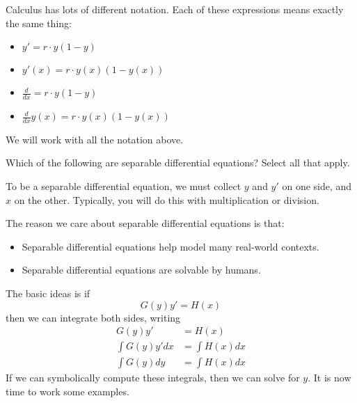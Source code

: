 \documentclass{ximera}
\begin{document}
\begin{warning}
  Calculus has lots of different notation. Each of these expressions
  means exactly the same thing:
  \begin{itemize}
  \item $y' = r\cdot y(1-y)$
  \item $y'(x) = r\cdot y(x)(1-y(x))$
  \item $\frac{d}{dx} = r \cdot y(1-y)$
  \item $\frac{d}{dx} y(x) = r\cdot y(x) (1-y(x))$
  \end{itemize}
  We will work with all the notation above.
\end{warning}

\begin{question}
  Which of the following are separable differential equations?  Select all that apply.
  \begin{selectAll}
  \end{selectAll}
  \begin{hint}
    To be a separable differential equation, we must collect $y$ and
    $y'$ on one side, and $x$ on the other. Typically, you will do
    this with multiplication or division.
  \end{hint}
\end{question}

The reason we care about separable differential equations is that:
\begin{itemize}
\item Separable differential equations help model many real-world contexts.
\item Separable differential equations are solvable by humans.
\end{itemize}
The basic ideas is if
\[
G(y)y' = H(x)
\]
then we can integrate both sides, writing
\begin{align*}
  G(y)y'  &= H(x)\\
  \int G(y) y' dx &= \int H(x) dx\\
  \int G(y) dy &= \int H(x) dx
\end{align*}
If we can symbolically compute these integrals, then we can solve for
$y$. It is now time to work some examples. 
\end{document}
